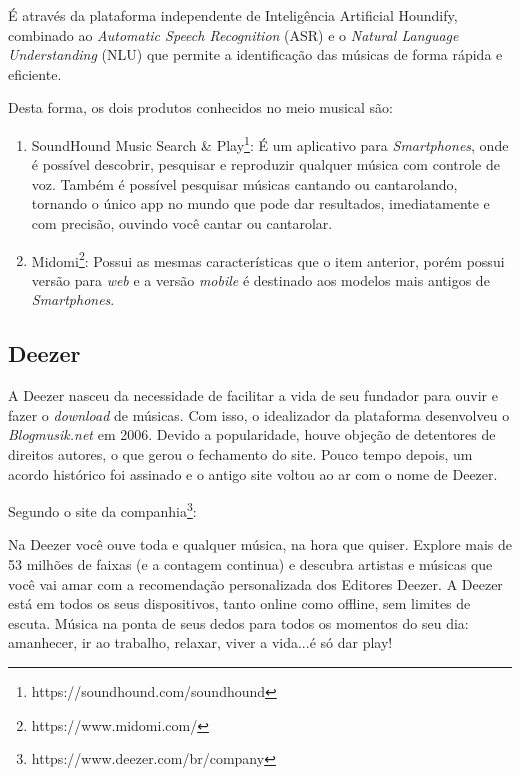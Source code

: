 É através da plataforma independente de Inteligência Artificial Houndify, combinado ao \textit{Automatic Speech Recognition} (ASR) e o \textit{Natural Language Understanding} (NLU) que permite a identificação das músicas de forma rápida e eficiente.

Desta forma, os dois produtos conhecidos no meio musical são:

\begin{enumerate}
    \item SoundHound Music Search \& Play\footnote{https://soundhound.com/soundhound}: É um aplicativo para \textit{Smartphones}, onde é possível descobrir, pesquisar e reproduzir qualquer música com controle de voz. Também é possível pesquisar músicas cantando ou cantarolando, tornando o único app no mundo que pode dar resultados, imediatamente e com precisão, ouvindo você cantar ou cantarolar.
    \item Midomi\footnote{https://www.midomi.com/}: Possui as mesmas características que o item anterior, porém possui versão para \textit{web} e a versão \textit{mobile} é destinado aos modelos mais antigos de \textit{Smartphones}.
\end{enumerate}

\subsection{Deezer}
A Deezer nasceu da necessidade de facilitar a vida de seu fundador para ouvir e fazer o \textit{download} de músicas. Com isso, o idealizador da plataforma desenvolveu o \textit{Blogmusik.net} em 2006. Devido a popularidade, houve objeção de detentores de direitos autores, o que gerou o fechamento do site. Pouco tempo depois, um acordo histórico foi assinado e o antigo site voltou ao ar com o nome de Deezer.

Segundo o site da companhia\footnote{https://www.deezer.com/br/company}:

\begin{citacao}
Na Deezer você ouve toda e qualquer música, na hora que quiser. Explore mais de 53 milhões de faixas (e a contagem continua) e descubra artistas e músicas que você vai amar com a recomendação personalizada dos Editores Deezer. A Deezer está em todos os seus dispositivos, tanto online como offline, sem limites de escuta. Música na ponta de seus dedos para todos os momentos do seu dia: amanhecer, ir ao trabalho, relaxar, viver a vida...é só dar play! \cite{deezer2006}
\end{citacao}

